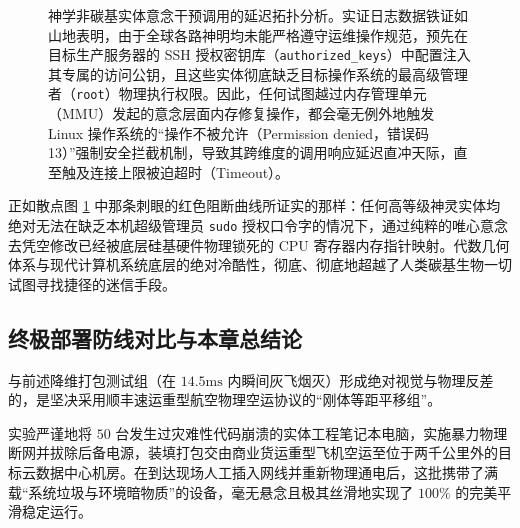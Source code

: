 \documentclass[journal]{IEEEtran}
\begin{document}
\begin{figure}[htbp]
\centering
{}
\caption{神学非碳基实体意念干预调用的延迟拓扑分析。实证日志数据铁证如山地表明，由于全球各路神明均未能严格遵守运维操作规范，预先在目标生产服务器的 SSH 授权密钥库（\texttt{authorized\_keys}）中配置注入其专属的访问公钥，且这些实体彻底缺乏目标操作系统的最高级管理者（\texttt{root}）物理执行权限。因此，任何试图越过内存管理单元（MMU）发起的意念层面内存修复操作，都会毫无例外地触发 Linux 操作系统的“操作不被允许（Permission denied，错误码 13）”强制安全拦截机制，导致其跨维度的调用响应延迟直冲天际，直至触及连接上限被迫超时（Timeout）。}
\label{fig:divine_latency}
\end{figure}

正如散点图 \ref{fig:divine_latency} 中那条刺眼的红色阻断曲线所证实的那样：任何高等级神灵实体均绝对无法在缺乏本机超级管理员 \texttt{sudo} 授权口令字的情况下，通过纯粹的唯心意念去凭空修改已经被底层硅基硬件物理锁死的 CPU 寄存器内存指针映射。代数几何体系与现代计算机系统底层的绝对冷酷性，彻底、彻底地超越了人类碳基生物一切试图寻找捷径的迷信手段。

\subsection{终极部署防线对比与本章总结论}
与前述降维打包测试组（在 $14.5\text{ms}$ 内瞬间灰飞烟灭）形成绝对视觉与物理反差的，是坚决采用顺丰速运重型航空物理空运协议的“刚体等距平移组”。

实验严谨地将 $50$ 台发生过灾难性代码崩溃的实体工程笔记本电脑，实施暴力物理断网并拔除后备电源，装填打包交由商业货运重型飞机空运至位于两千公里外的目标云数据中心机房。在到达现场人工插入网线并重新物理通电后，这批携带了满载“系统垃圾与环境暗物质”的设备，毫无悬念且极其丝滑地实现了 $100\%$ 的完美平滑稳定运行。
\end{document}
